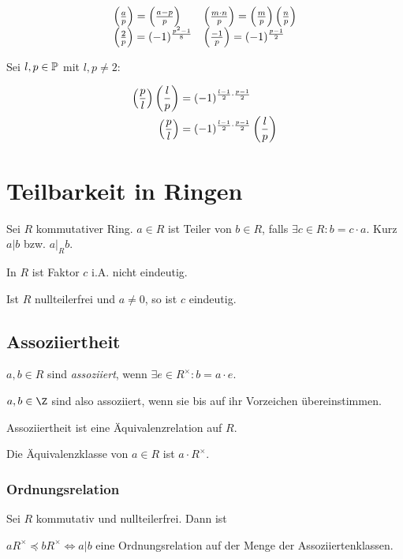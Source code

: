 \vspace*{-2mm}
$$\begin{array}{ll}
\left(\frac{a}{p}\right) = \left(\frac{a-p}{p}\right) & \left(\frac{m \cdot n}{p}\right) = \left(\frac{m}{p}\right)\left(\frac{n}{p}\right) \\
\left(\frac{2}{p}\right) = (-1)^{\frac{p^2-1}{8}} & \left(\frac{-1}{p}\right) = (-1)^{\frac{p-1}{2}}
\end{array}$$

Sei $l, p \in \mathbb{P}$ mit $l, p \neq 2$:

\vspace*{-4mm}
\begin{align*}
	\left(\frac{p}{l}\right)\left(\frac{l}{p}\right) &= (-1)^{\frac{l-1}{2}\cdot\frac{p-1}{2}} \\
	\left(\frac{p}{l}\right) &= (-1)^{\frac{l-1}{2}\cdot\frac{p-1}{2}} \left(\frac{l}{p}\right)
\end{align*}

\section*{Teilbarkeit in Ringen}

Sei $R$ kommutativer Ring. $a \in R$ ist Teiler von $b \in R$, falls $\exists c \in R : b = c \cdot a$. Kurz $a | b$ bzw. $a |_R b$.

In $R$ ist Faktor $c$ i.A. nicht eindeutig.

Ist $R$ nullteilerfrei und $a \neq 0$, so ist $c$ eindeutig.

\subsection*{Assoziiertheit}

$a, b \in R$ sind \emph{assoziiert}, wenn $\exists e \in R^\times : b = a\cdot e$.

$a, b \in \Z$ sind also assoziiert, wenn sie bis auf ihr Vorzeichen übereinstimmen.

Assoziiertheit ist eine Äquivalenzrelation auf $R$.

Die Äquivalenzklasse von $a \in R$ ist $a \cdot R^\times$.

\subsubsection*{Ordnungsrelation}

Sei $R$ kommutativ und nullteilerfrei. Dann ist

$aR^\times \preccurlyeq bR^\times \iff a | b$ eine Ordnungsrelation auf der Menge der Assoziiertenklassen.

